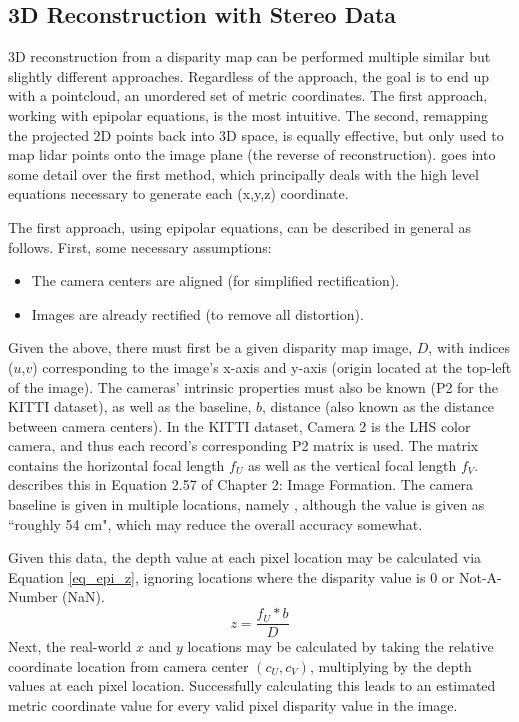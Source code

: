 \subsection{3D Reconstruction with Stereo Data}
\label{sect_reconstruct}
3D reconstruction from a disparity map can be performed multiple similar but slightly different approaches. Regardless of the approach, the goal is to end up with a pointcloud, an unordered set of metric coordinates. The first approach, working with epipolar equations, is the most intuitive. The second, remapping the projected 2D points back into 3D space, is equally effective, but only used to map lidar points onto the image plane (the reverse of reconstruction). \cite{szeliski_computer_2010} goes into some detail over the first method, which principally deals with the high level equations necessary to generate each (x,y,z) coordinate.

The first approach, using epipolar equations, can be described in general as follows. First, some necessary assumptions:
\begin{itemize} \itemsep=-0.5em
    \item The camera centers are aligned (for simplified rectification).
    \item Images are already rectified (to remove all distortion).
\end{itemize}

Given the above, there must first be a given disparity map image, $D$, with indices ($u$,$v$) corresponding to the image's x-axis and y-axis (origin located at the top-left of the image). The cameras' intrinsic properties must also be known (P2 for the KITTI dataset), as well as the baseline, $b$, distance (also known as the distance between camera centers). In the KITTI dataset, Camera 2 is the LHS color camera, and thus each record's corresponding P2 matrix is used. The matrix contains the horizontal focal length $f_U$ as well as the vertical focal length $f_V$. \cite{szeliski_computer_2010} describes this in Equation 2.57 of Chapter 2: Image Formation. The camera baseline is given in multiple locations, namely \cite{geiger_are_2012}, although the value is given as ``roughly 54 cm", which may reduce the overall accuracy somewhat.

Given this data, the depth value at each pixel location may be calculated via Equation \ref{eq_epi_z}, ignoring locations where the disparity value is 0 or Not-A-Number (NaN).
\begin{equation}
z = \frac{f_U * b}{D}
\label{eq_epi_z}
\end{equation}
Next, the real-world $x$ and $y$ locations may be calculated by taking the relative coordinate location from camera center $(c_U,c_V)$, multiplying by the depth values at each pixel location. Successfully calculating this leads to an estimated metric coordinate value for every valid pixel disparity value in the image.

